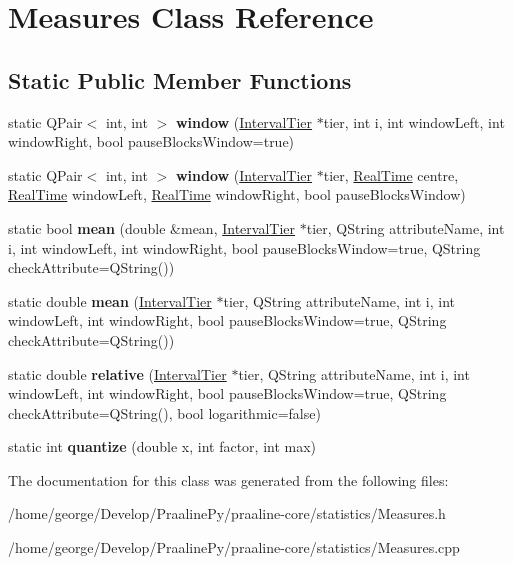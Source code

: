 \hypertarget{class_measures}{}\section{Measures Class Reference}
\label{class_measures}
\subsection*{Static Public Member Functions}
\begin{DoxyCompactItemize}
\item 
\mbox{\label{class_measures_a321b8c698cfc8c2ced8f37abbbe75506}} 
static Q\+Pair$<$ int, int $>$ {\bfseries window} (\hyperlink{class_interval_tier}{Interval\+Tier} $\ast$tier, int i, int window\+Left, int window\+Right, bool pause\+Blocks\+Window=true)
\item 
\mbox{\label{class_measures_abf16f6e9c238f7592e81b28e7dff256f}} 
static Q\+Pair$<$ int, int $>$ {\bfseries window} (\hyperlink{class_interval_tier}{Interval\+Tier} $\ast$tier, \hyperlink{struct_real_time}{Real\+Time} centre, \hyperlink{struct_real_time}{Real\+Time} window\+Left, \hyperlink{struct_real_time}{Real\+Time} window\+Right, bool pause\+Blocks\+Window)
\item 
\mbox{\label{class_measures_a65654b4e751412b27745b455f8b7d7d8}} 
static bool {\bfseries mean} (double \&mean, \hyperlink{class_interval_tier}{Interval\+Tier} $\ast$tier, Q\+String attribute\+Name, int i, int window\+Left, int window\+Right, bool pause\+Blocks\+Window=true, Q\+String check\+Attribute=Q\+String())
\item 
\mbox{\label{class_measures_a73ae02cceef06b52e2eee12d322b0cb6}} 
static double {\bfseries mean} (\hyperlink{class_interval_tier}{Interval\+Tier} $\ast$tier, Q\+String attribute\+Name, int i, int window\+Left, int window\+Right, bool pause\+Blocks\+Window=true, Q\+String check\+Attribute=Q\+String())
\item 
\mbox{\label{class_measures_a3097db33b3cb869242dc73d4834c9de4}} 
static double {\bfseries relative} (\hyperlink{class_interval_tier}{Interval\+Tier} $\ast$tier, Q\+String attribute\+Name, int i, int window\+Left, int window\+Right, bool pause\+Blocks\+Window=true, Q\+String check\+Attribute=Q\+String(), bool logarithmic=false)
\item 
\mbox{\label{class_measures_ae05e567eaf8606ab03975bdd35028695}} 
static int {\bfseries quantize} (double x, int factor, int max)
\end{DoxyCompactItemize}


The documentation for this class was generated from the following files\+:\begin{DoxyCompactItemize}
\item 
/home/george/\+Develop/\+Praaline\+Py/praaline-\/core/statistics/Measures.\+h\item 
/home/george/\+Develop/\+Praaline\+Py/praaline-\/core/statistics/Measures.\+cpp\end{DoxyCompactItemize}
